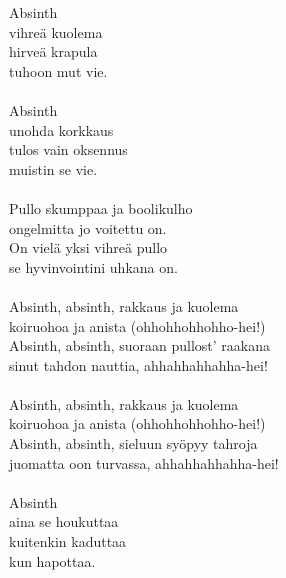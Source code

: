 
            Absinth \\
            vihreä kuolema \\
            hirveä krapula \\
            tuhoon mut vie. \\
\hspace{10mm} \\
            Absinth \\
            unohda korkkaus \\
            tulos vain oksennus \\
            muistin se vie. \\
\hspace{10mm} \\
            Pullo skumppaa ja boolikulho \\
            ongelmitta jo voitettu on. \\
            On vielä yksi vihreä pullo \\
            se hyvinvointini uhkana on. \\
\hspace{10mm} \\
            Absinth, absinth, rakkaus ja kuolema \\
            koiruohoa ja anista (ohhohhohhohho-hei!) \\
            Absinth, absinth, suoraan pullost' raakana \\
            sinut tahdon nauttia, ahhahhahhahha-hei! \\
\hspace{10mm} \\
            Absinth, absinth, rakkaus ja kuolema \\
            koiruohoa ja anista (ohhohhohhohho-hei!) \\
            Absinth, absinth, sieluun syöpyy tahroja \\
            juomatta oon turvassa, ahhahhahhahha-hei! \\
\hspace{10mm} \\
            Absinth \\
            aina se houkuttaa \\
            kuitenkin kaduttaa \\
            kun hapottaa. \\
\hspace{10mm} \\
